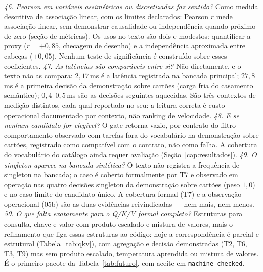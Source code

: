 \textit{46. Pearson em variáveis assimétricas ou discretizadas faz sentido?} Como medida descritiva de associação linear, com os limites declarados: Pearson $r$ mede associação linear, sem demonstrar causalidade ou independência quando próximo de zero (seção de métricas). Os usos no texto são dois e modestos: quantificar a proxy ($r=+0{,}85$, checagem de desenho) e a independência aproximada entre cabeças ($+0{,}05$). Nenhum teste de significância é construído sobre esses coeficientes.
\textit{47. As latências são comparáveis entre si?} Não diretamente, e o texto não as compara: $2{,}17$\,ms é a latência registrada na bancada principal; $27{,}8$\,ms é a primeira decisão da demonstração sobre cartões (carga fria do casamento semântico); $0{,}4$--$0{,}5$\,ms são as decisões seguintes aquecidas. São três contextos de medição distintos, cada qual reportado no seu: a leitura correta é custo operacional documentado por contexto, não ranking de velocidade.
\textit{48. E se nenhum candidato for elegível?} O gate retorna vazio, por contrato do filtro --- comportamento observado com tarefas fora do vocabulário na demonstração sobre cartões, registrado como compatível com o contrato, não como falha. A cobertura do vocabulário do catálogo ainda requer avaliação (Seção~\ref{cap:resultados}).
\textit{49. O singleton aparece na bancada sintética?} O texto não registra a frequência de singleton na bancada; o caso é coberto formalmente por T7 e observado em operação nas quatro decisões singleton da demonstração sobre cartões (peso $1{,}0$) e no caso-limite do candidato único. A cobertura formal (T7) e a observação operacional (05b) são as duas evidências reivindicadas --- nem mais, nem menos.
\textit{50. O que falta exatamente para o Q/K/V formal completo?} Estruturas para consulta, chave e valor com produto escalado e mistura de valores, mais o refinamento que liga essas estruturas ao código: hoje a correspondência é parcial e estrutural (Tabela~\ref{tab:qkv}), com agregação e decisão demonstradas (T2, T6, T3, T9) mas sem produto escalado, temperatura aprendida ou mistura de valores. É o primeiro pacote da Tabela~\ref{tab:futuro}, com aceite em \texttt{machine-checked}.
